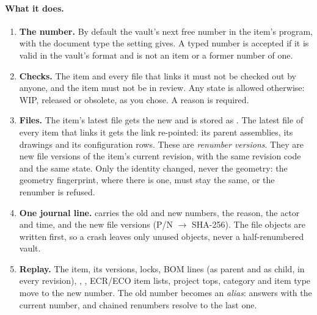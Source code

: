 \paragraph{What it does.}
\begin{enumerate}[nosep]
  \item \textbf{The number.} By default the vault's next free number in the item's program, with the document type
        the setting gives. A typed number is accepted if it is valid in the vault's format and is not an item or a
        former number of one.
  \item \textbf{Checks.} The item and every file that links it must not be checked out by anyone, and the item must
        not be in review. Any state is allowed otherwise: WIP, released or obsolete, as you chose. A reason is
        required.
  \item \textbf{Files.} The item's latest file gets the new  and is stored as
        . The latest file of every item that links it gets the link re-pointed:
        its parent assemblies, its drawings and its configuration rows. These are \emph{renumber versions}. They are
        new file versions of the item's current revision, with the same revision code and the same state. Only the
        identity changed, never the geometry: the geometry fingerprint, where there is one, must stay the same, or
        the renumber is refused.
  \item \textbf{One journal line.}  carries the old and new numbers, the reason, the actor and time,
        and the new file versions (P/N $\to$ SHA-256). The file objects are written first, so a crash leaves only
        unused objects, never a half-renumbered vault.
  \item \textbf{Replay.} The item, its versions, locks, BOM lines (as parent and as child, in every revision),
        , , ECR/ECO item lists, project tops, category and item type move
        to the new number. The old number becomes an \emph{alias}:  answers with the current
        number, and chained renumbers resolve to the last one.
\end{enumerate}

